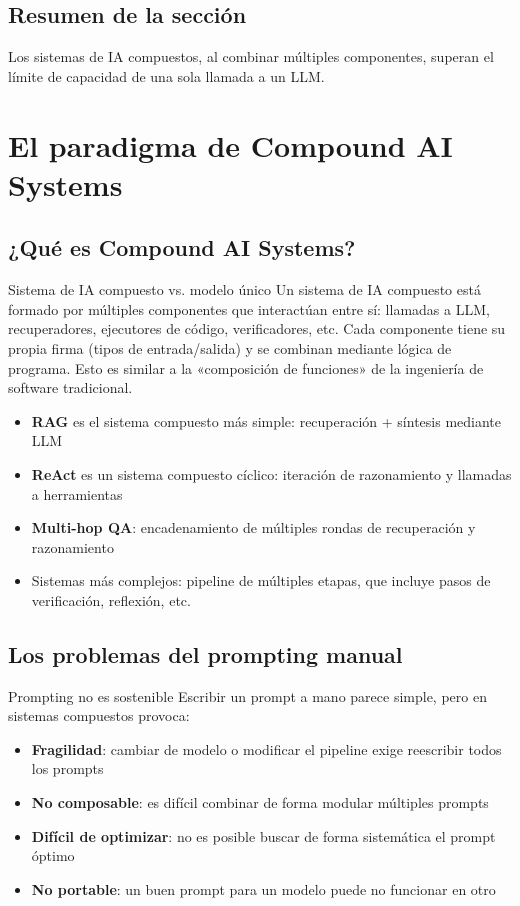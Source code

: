 \documentclass[a4paper]{article}
\begin{document}
\subsection{Resumen de la sección}

Los sistemas de IA compuestos, al combinar múltiples componentes, superan el límite de capacidad de una sola llamada a un LLM.
\section{El paradigma de Compound AI Systems}

\subsection{¿Qué es Compound AI Systems?}

\begin{knowledgebox}{Sistema de IA compuesto vs. modelo único}
Un sistema de IA compuesto está formado por múltiples componentes que interactúan entre sí: llamadas a LLM, recuperadores, ejecutores de código, verificadores, etc. Cada componente tiene su propia firma (tipos de entrada/salida) y se combinan mediante lógica de programa. Esto es similar a la «composición de funciones» de la ingeniería de software tradicional.
\end{knowledgebox}

\begin{itemize}
    \item \textbf{RAG} es el sistema compuesto más simple: recuperación + síntesis mediante LLM
    \item \textbf{ReAct} es un sistema compuesto cíclico: iteración de razonamiento y llamadas a herramientas
    \item \textbf{Multi-hop QA}: encadenamiento de múltiples rondas de recuperación y razonamiento
    \item Sistemas más complejos: pipeline de múltiples etapas, que incluye pasos de verificación, reflexión, etc.
\end{itemize}

\subsection{Los problemas del prompting manual}

\begin{warningbox}{Prompting no es sostenible}
Escribir un prompt a mano parece simple, pero en sistemas compuestos provoca:
\begin{itemize}
    \item \textbf{Fragilidad}: cambiar de modelo o modificar el pipeline exige reescribir todos los prompts
    \item \textbf{No composable}: es difícil combinar de forma modular múltiples prompts
    \item \textbf{Difícil de optimizar}: no es posible buscar de forma sistemática el prompt óptimo
    \item \textbf{No portable}: un buen prompt para un modelo puede no funcionar en otro
\end{itemize}
\end{warningbox}
\end{document}
